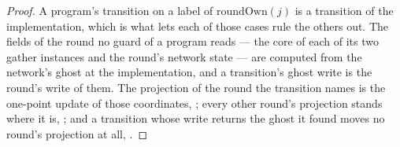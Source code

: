 \begin{proof}
  A program's transition on a label of $\mathrm{roundOwn}(j)$ is a transition of the implementation, which is what lets each of those cases rule the others out.
  The fields of the round no guard of a program reads --- the core of each of its two gather instances and the round's network state --- are computed from the network's ghost at the implementation, and a transition's ghost write is the round's write of them.
  The projection of the round the transition names is the one-point update of those coordinates, ; every other round's projection stands where it is, ; and a transition whose write returns the ghost it found moves no round's projection at all, .
\end{proof}
